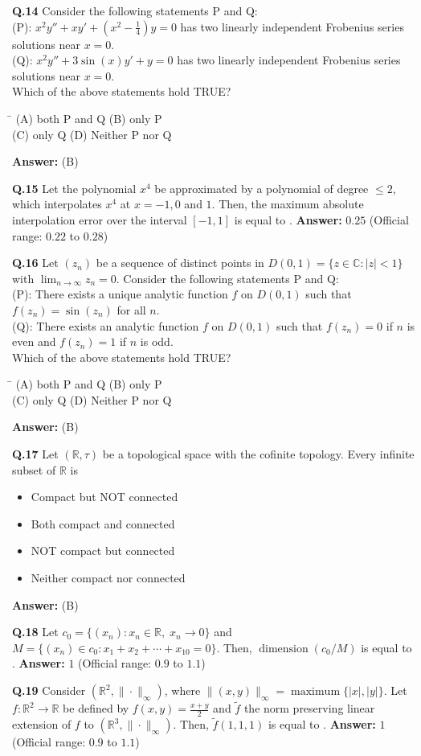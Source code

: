 \documentclass[11pt,a4paper]{article}
\newcommand{\optsfourA}[4]{%
  \begin{tabbing}
    \hspace{0.48\linewidth}\=\kill
    (A) #1 \> (B) #2 \\[2pt]
    (C) #3 \> (D) #4
  \end{tabbing}%
}
\newcommand{\optslistA}[4]{%
  \begin{itemize}
    \setlength{\itemsep}{2pt}\setlength{\parskip}{0pt}
    \item[(A)] #1
    \item[(B)] #2
    \item[(C)] #3
    \item[(D)] #4
  \end{itemize}%
}
\newcommand{\ans}[1]{\textbf{Answer:} #1\par\medskip}
\begin{document}
\textbf{Q.14} Consider the following statements P and Q:\\
(P): $x^2 y'' + x y' + \left(x^2 - \frac{1}{4}\right)y = 0$ has two linearly independent Frobenius series solutions near $x = 0$.\\
(Q): $x^2 y'' + 3\sin(x) y' + y = 0$ has two linearly independent Frobenius series solutions near $x = 0$.\\
Which of the above statements hold TRUE?
\optsfourA{both P and Q}{only P}{only Q}{Neither P nor Q}
\ans{(B)}

\textbf{Q.15} Let the polynomial $x^4$ be approximated by a polynomial of degree $\le 2$, which interpolates $x^4$ at $x = -1, 0$ and $1$. Then, the maximum absolute interpolation error over the interval $[-1, 1]$ is equal to \underline{\hspace{2cm}}.
\ans{$0.25$ (Official range: $0.22$ to $0.28$)}

\textbf{Q.16} Let $(z_n)$ be a sequence of distinct points in $D(0, 1) = \{z \in \mathbb{C} : |z| < 1\}$ with $\lim_{n\to\infty} z_n = 0$. Consider the following statements P and Q:\\
(P): There exists a unique analytic function $f$ on $D(0, 1)$ such that $f(z_n) = \sin(z_n)$ for all $n$.\\
(Q): There exists an analytic function $f$ on $D(0, 1)$ such that $f(z_n) = 0$ if $n$ is even and $f(z_n) = 1$ if $n$ is odd.\\
Which of the above statements hold TRUE?
\optsfourA{both P and Q}{only P}{only Q}{Neither P nor Q}
\ans{(B)}

\textbf{Q.17} Let $(\mathbb{R}, \tau)$ be a topological space with the cofinite topology. Every infinite subset of $\mathbb{R}$ is
\optslistA{Compact but NOT connected}{Both compact and connected}{NOT compact but connected}{Neither compact nor connected}
\ans{(B)}

\textbf{Q.18} Let $c_0 = \{(x_n) : x_n \in \mathbb{R},\; x_n \to 0\}$ and $M = \{(x_n) \in c_0 : x_1 + x_2 + \cdots + x_{10} = 0\}$. Then, $\operatorname{dimension}(c_0 / M)$ is equal to \underline{\hspace{2cm}}.
\ans{$1$ (Official range: $0.9$ to $1.1$)}

\textbf{Q.19} Consider $(\mathbb{R}^2, \|\cdot\|_\infty)$, where $\|(x, y)\|_\infty = \operatorname{maximum}\{|x|, |y|\}$. Let $f : \mathbb{R}^2 \to \mathbb{R}$ be defined by $f(x, y) = \frac{x + y}{2}$ and $\tilde{f}$ the norm preserving linear extension of $f$ to $(\mathbb{R}^3, \|\cdot\|_\infty)$. Then, $\tilde{f}(1, 1, 1)$ is equal to \underline{\hspace{2cm}}.
\ans{$1$ (Official range: $0.9$ to $1.1$)}
\end{document}
